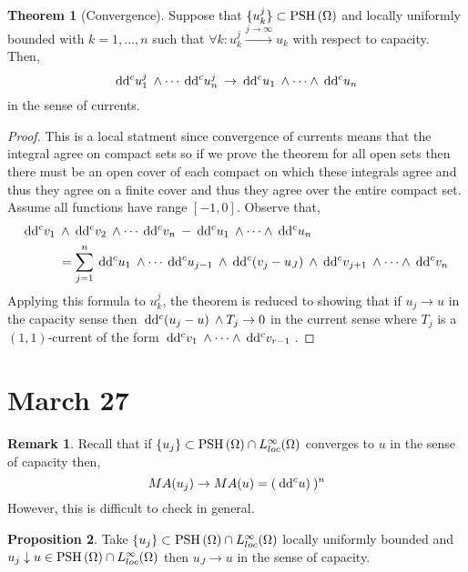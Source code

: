 \documentclass[12pt]{extarticle}
\renewcommand{\d}[1]{\: \mathrm{d}#1 \:}
\theoremstyle{definition}
\newtheorem{theorem}{Theorem}[section]
\newtheorem{proposition}[theorem]{Proposition}
\newtheorem{remark}{Remark}
\begin{document}
\begin{theorem}[Convergence]
Suppose that $\{ u^j_k \} \subset \mathrm{PSH}\left( \Omega \right)$ and locally uniformly bounded with $k = 1, \dots, n$ such that $\forall k : u^j_k \xrightarrow{j \to \infty} u_k$ with respect to capacity. Then,
\[ \d{\dc{u_1^j}} \wedge \cdots \d{\dc{u_n^j}} \to \d{\dc{u_1}} \wedge \cdots \wedge \d{\dc{u_n}} \]
in the sense of currents. 
\end{theorem}

\begin{proof}
This is a local statment since convergence of currents means that the integral agree on compact sets so if we prove the theorem for all open sets then there must be an open cover of each compact on which these integrals agree and thus they agree on a finite cover and thus they agree over the entire compact set. 
\bigskip\\
Assume all functions have range $[-1,0]$. Observe that,
\begin{align*}
\d{\dc{v_1}} & \wedge \d{\dc{v_2}} \wedge \cdots \d{\dc{v_n}} - \d{\dc{u_1}} \wedge \cdots \wedge \d{\dc{u_n}}
\\
& = \sum_{j = 1}^n \d{\dc{u_1}} \wedge \cdots \d{\dc{u_{j-1}}} \wedge \d{\dc{(v_j - u_J)}} \wedge \d{\dc{v_{j+1}}} \wedge \cdots \wedge \d{\dc{v_n}} 
\end{align*}
Applying this formula to $u^j_k$, the theorem is reduced to showing that if $u_j \to u$ in the capacity sense then $\d{\dc{(u_j - u)}} \wedge T_j \to 0$ in the current sense where $T_j$ is a $(1,1)$-current of the form $\d{\dc{v_1}} \wedge \cdots \wedge \d{\dc{v_{r-1}}}$. 
\end{proof}

\section{March 27}

\begin{remark}
Recall that if $\{ u_j \} \subset \mathrm{PSH}\left( \Omega \right) \cap L^\infty_{loc}(\Omega)$ converges to $u$ in the sense of capacity then,
\[ MA(u_j) \to MA(u) = (\d{\dc{u})})^n \]
However, this is difficult to check in general.
\end{remark}

\begin{proposition}
Take $\{ u_j \} \subset \mathrm{PSH}\left( \Omega \right) \cap L^\infty_{loc}(\Omega)$ locally uniformly bounded and $u_j \downarrow u \in \mathrm{PSH}\left( \Omega \right) \cap L^\infty_{loc}(\Omega)$ then $u_J \to u$ in the sense of capacity.
\end{proposition}
\end{document}
